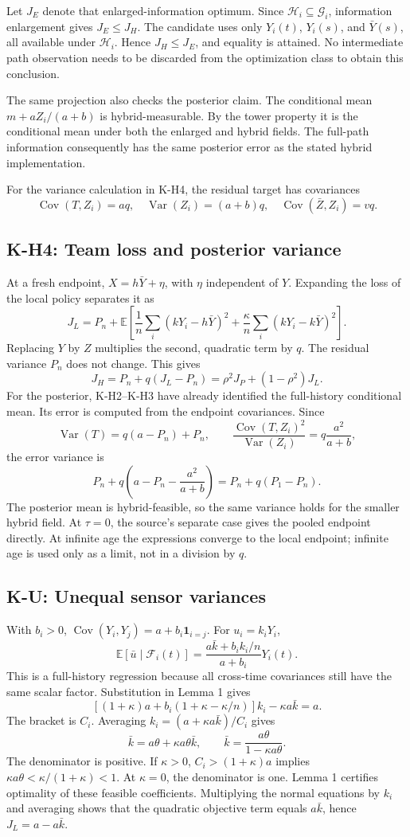 \documentclass[11pt,letterpaper]{article}
\newcommand{\E}{\mathbb E}
\newcommand{\Var}{\operatorname{Var}}
\newcommand{\Cov}{\operatorname{Cov}}
\newcommand{\G}{\mathcal G}
\newcommand{\F}{\mathcal F}
\newcommand{\HH}{\mathcal H}
\newcommand{\calculation}[2]{\subsection{#1: #2}}
\begin{document}
Let $J_E$ denote that enlarged-information optimum. Since $\HH_i\subseteq\G_i$, information enlargement gives $J_E\le J_H$. The candidate uses only $Y_i(t)$, $Y_i(s)$, and $\bar Y(s)$, all available under $\HH_i$. Hence $J_H\le J_E$, and equality is attained. No intermediate path observation needs to be discarded from the optimization class to obtain this conclusion.

The same projection also checks the posterior claim. The conditional mean $m+aZ_i/(a+b)$ is hybrid-measurable. By the tower property it is the conditional mean under both the enlarged and hybrid fields. The full-path information consequently has the same posterior error as the stated hybrid implementation.

For the variance calculation in K-H4, the residual target has covariances
\[
\Cov(T,Z_i)=a q,\quad
\Var(Z_i)=(a+b)q,\quad
\Cov(\bar Z,Z_i)=vq.
\]

\calculation{K-H4}{Team loss and posterior variance}
At a fresh endpoint, $X=h\bar Y+\eta$, with $\eta$ independent of $Y$. Expanding the loss of the local policy separates it as
\[
J_L=P_n+
\E\left[\frac1n\sum_i(kY_i-h\bar Y)^2+
\frac\kappa n\sum_i(kY_i-k\bar Y)^2\right].
\]
Replacing $Y$ by $Z$ multiplies the second, quadratic term by $q$. The residual variance $P_n$ does not change. This gives
\[
J_H=P_n+q(J_L-P_n)=\rho^2J_P+(1-\rho^2)J_L.
\]
For the posterior, K-H2--K-H3 have already identified the full-history conditional mean. Its error is computed from the endpoint covariances. Since
\[
\Var(T)=q(a-P_n)+P_n,\qquad
\frac{\Cov(T,Z_i)^2}{\Var(Z_i)}=q\frac{a^2}{a+b},
\]
the error variance is
\[
P_n+q\left(a-P_n-\frac{a^2}{a+b}\right)
=P_n+q(P_1-P_n).
\]
The posterior mean is hybrid-feasible, so the same variance holds for the smaller hybrid field. At $\tau=0$, the source's separate case gives the pooled endpoint directly. At infinite age the expressions converge to the local endpoint; infinite age is used only as a limit, not in a division by $q$.

\calculation{K-U}{Unequal sensor variances}
With $b_i>0$, $\Cov(Y_i,Y_j)=a+b_i\mathbf1_{i=j}$. For $u_i=k_iY_i$,
\[
\E[\bar u\mid\F_i(t)]
=\frac{a\bar k+b_i k_i/n}{a+b_i}Y_i(t).
\]
This is a full-history regression because all cross-time covariances still have the same scalar factor. Substitution in Lemma 1 gives
\[
\left[(1+\kappa)a+b_i(1+\kappa-\kappa/n)\right]k_i
-\kappa a\bar k=a.
\]
The bracket is $C_i$. Averaging $k_i=(a+\kappa a\bar k)/C_i$ gives
\[
\bar k=a\theta+\kappa a\theta\bar k,
\qquad \bar k=\frac{a\theta}{1-\kappa a\theta}.
\]
The denominator is positive. If $\kappa>0$, $C_i>(1+\kappa)a$ implies $\kappa a\theta<\kappa/(1+\kappa)<1$. At $\kappa=0$, the denominator is one. Lemma 1 certifies optimality of these feasible coefficients. Multiplying the normal equations by $k_i$ and averaging shows that the quadratic objective term equals $a\bar k$, hence $J_L=a-a\bar k$.
\end{document}
